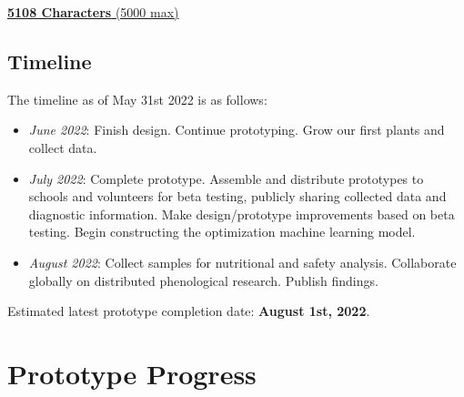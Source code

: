 \documentclass{../tex/report}
\begin{document}
\uline{\textbf{5108 Characters} (5000 max)}

\clearpage

\subsection{Timeline}


The timeline as of May 31st 2022 is as follows:
\begin{itemize}
    \item \textit{June 2022}: Finish design. Continue prototyping. Grow our first plants and collect data.
    \item \textit{July 2022}: Complete prototype. Assemble and distribute prototypes to schools and volunteers for beta testing, publicly sharing collected data and diagnostic information. Make design/prototype improvements based on beta testing. Begin constructing the optimization machine learning model.
    \item \textit{August 2022}: Collect samples for nutritional and safety analysis. Collaborate globally on distributed phenological research. Publish findings.
\end{itemize}

Estimated latest prototype completion date: \textbf{August 1st, 2022}.

\clearpage

\section{Prototype Progress}



\clearpage



\clearpage



\clearpage



\clearpage



\end{document}
